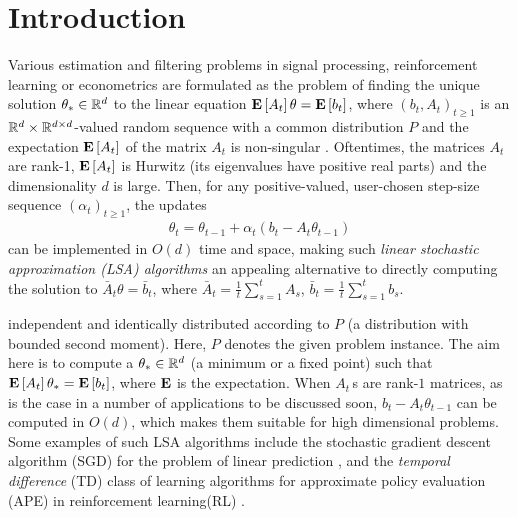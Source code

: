 
\section{Introduction}\label{sec:intro}
Various estimation and filtering problems in signal processing, reinforcement learning or econometrics
are formulated as the problem of finding the unique solution $\theta_*\in \mathbb{R}^d$ 
to the linear equation $\mathbf{E}\left[A_t\right] \theta = \mathbf{E}\left[b_t\right]$,
where $(b_t,A_t)_{t\ge 1}$ is an $\mathbb{R}^d \times \mathbb{R}^{d \times d}$-valued random sequence with a common distribution $P$
and the expectation $\mathbf{E}\left[A_t\right]$ of the matrix $A_t$ is non-singular \citep[e.g.,][]{bemepri90,LjPfWa92,SoKo94,degylu96,
sutton,konda-tsitsiklis,KoTsi03LSA,gtd,gtd2,gtdmp}.
Oftentimes, the matrices $A_t$ are rank-1, $\mathbf{E}\left[A_t\right]$ is Hurwitz (its eigenvalues have positive real parts)
and the dimensionality $d$ is large.
Then, for any positive-valued, user-chosen step-size sequence $(\alpha_t)_{t\ge 1}$, the updates
\begin{align}\label{eq:lsaintro}
\theta_t=\theta_{t-1}+\alpha_t (b_t-A_t \theta_{t-1})
\end{align}
can be implemented in $O(d)$ time and space, making such 
\emph{linear stochastic approximation (LSA) algorithms} 
an appealing alternative to directly 
computing the solution to $\bar A_t \theta = \bar b_t$, where $\bar A_t = \frac1t\sum_{s=1}^t A_s$, $\bar b_t = \frac1t \sum_{s=1}^t b_s$.

independent and identically distributed according to $P$ (a distribution with bounded second moment). Here, $P$ denotes the given problem instance. The aim here is to compute a $\theta_*\in\mathbb{R}^d$ (a minimum or a fixed point) such that $\mathbf{E}\left[A_t\right]\theta_*=\mathbf{E}\left[b_t\right]$, where $\mathbf{E}$ is the expectation. When $A_t\,$s are rank-$1$ matrices, as is the case in a number of applications to be discussed soon, $b_t -A_t\theta_{t-1}$ can be computed in $O(d)$, which makes them suitable for high dimensional problems. Some examples of such LSA algorithms include the stochastic gradient descent algorithm (SGD) for the problem of linear prediction \cite{bach,bachaistats}, and the \emph{temporal difference} (TD) class of learning algorithms for approximate policy evaluation (APE) in reinforcement learning(RL) \cite{sutton,konda-tsitsiklis,KoTsi03LSA,gtd,gtd2,gtdmp}.
\fi

